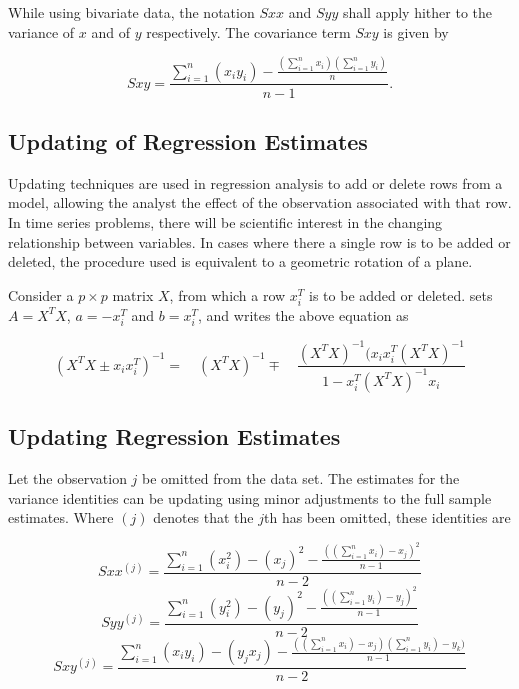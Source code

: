 \documentclass[12pt, a4paper]{report}
\theoremstyle{plain}
\theoremstyle{definition}
\theoremstyle{remark}
\begin{document}
While using bivariate data, the notation $Sxx$ and $Syy$ shall apply hither to the variance of $x$ and of $y$ respectively. The covariance term $Sxy$ is given by

\begin{equation}
Sxy=\frac{\sum_{i=1}^{n}(x_{i}y_{i})-\frac{(\sum_{i=1}^{n}x_{i})(\sum_{i=1}^{n}y_{i})}{n}}{n-1}.
\end{equation}

\subsection{Updating of Regression Estimates}
Updating techniques are used in regression analysis to add or
delete rows from a model, allowing the analyst the effect of the
observation associated with that row. In time series problems,
there will be scientific interest in the changing relationship
between variables. In cases where there a single row is to be
added or deleted, the procedure used is equivalent to a geometric
rotation of a plane.

Consider a $p \times p$ matrix $X$, from which a row $x_{i}^{T}$
is to be added or deleted. \citet{CookWeisberg} sets $A = X^{T}X$,
$a=-x_{i}^{T}$ and $b=x_{i}^{T}$, and writes the above equation as

\begin{equation}
(X^{T}X \pm x_{i}x_{i}^{T})^{-1} = \quad(X^{T}X )^{-1} \mp \quad
\frac{(X^{T}X)^{-1}(x_{i}x_{i}^{T}(X^{T}X)^{-1}}{1-x_{i}^{T}(X^{T}X)^{-1}x_{i}}
\end{equation}

\subsection{Updating Regression Estimates}
Let the observation $j$ be omitted from the data set. The estimates for the variance identities can be updating using minor adjustments to the full sample estimates. Where $(j)$ denotes that the $j$th has been omitted, these identities are

\begin{equation}
Sxx^{(j)}=\frac{\sum_{i=1}^{n}(x_{i}^{2})-(x_{j})^{2}-\frac{((\sum_{i=1}^{n}x_{i})-x_{j})^{2}}{n-1}}{n-2}
\end{equation}
\begin{equation}
Syy^{(j)}=\frac{\sum_{i=1}^{n}(y_{i}^{2})-(y_{j})^{2}-\frac{((\sum_{i=1}^{n}y_{i})-y_{j})^{2}}{n-1}}{n-2}
\end{equation}
\begin{equation}
Sxy^{(j)}=\frac{\sum_{i=1}^{n}(x_{i}y_{i})-(y_{j}x_{j})-\frac{((\sum_{i=1}^{n}x_{i})-x_{j})(\sum_{i=1}^{n}y_{i})-y_{k})}{n-1}}{n-2}
\end{equation}
\end{document}
